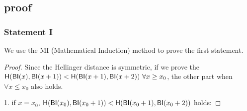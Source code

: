 \documentclass{article}
\begin{document}
\subsection{proof}

\subsubsection{Statement I}
We use the MI (Mathematical Induction) method to prove the first statement.

\begin{proof}
Since the Hellinger distance is symmetric, if we prove the $\mathsf{H} (\mathsf{BI}(x), \mathsf{BI}(x + 1)) < \mathsf{H} (\mathsf{BI}(x + 1), \mathsf{BI}(x + 2))\ \forall x \geq x_0$, the other part when $\forall x \leq x_0$ also holds.

1. if $x = x_0$, $\mathsf{H} (\mathsf{BI}(x_0), \mathsf{BI}(x_0 + 1)) < \mathsf{H} (\mathsf{BI}(x_0 + 1), \mathsf{BI}(x_0 + 2))$ holds:



\end{proof}
\end{document}

